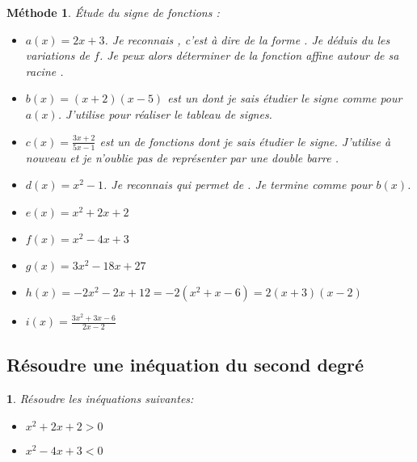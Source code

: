 \documentclass{beamer}
\newtheorem{exercise}[theorem]{\translate{Exercise}}
\newtheorem{methode}[theorem]{{Méthode}}
\begin{document}
  \begin{frame}
    \begin{methode}
    \'Etude du signe de fonctions :
    \begin{itemize}
      \item $a(x)=2x+3$. Je reconnais , 
      c'est à dire de la forme .
      Je déduis du  les variations de $f$. Je peux alors déterminer 
       de la fonction affine autour de sa racine
      .
      \item $b(x)=(x+2)(x-5)$ est un 
       dont je sais
      étudier le signe comme pour $a(x)$. J'utilise 
      pour réaliser le tableau de signes.
     \item $c(x)=\frac{3x+2}{5x-1}$ est un  
     de fonctions dont je sais étudier le signe. J'utilise à nouveau 
      et
     je n'oublie pas de représenter  
     par une double barre .
     \item $d(x)=x^2-1$. Je reconnais  qui permet
     de . Je termine comme pour $b(x)$.
     \item $e(x)=x^2+2x+2$
     \item $f(x)=x^2-4x+3$
     \item $g(x)=3x^2-18x+27$
     \item $h(x)=-2x^2-2x+12=-2(x^2+x-6)=2(x+3)(x-2)$
     \item $i(x)=\frac{3x^2+3x-6}{2x-2}$
   \end{itemize}    
  \end{methode}
  \end{frame}
  
  \subsection{Résoudre une inéquation du second degré}
  
  \begin{frame}
  \begin{exercise}
    Résoudre les inéquations suivantes:
    \begin{itemize}
     \item $x^2+2x+2>0$
     \item $x^2-4x+3<0$
   \end{itemize}    
  \end{exercise} 
  \end{frame}
  
\end{document}
